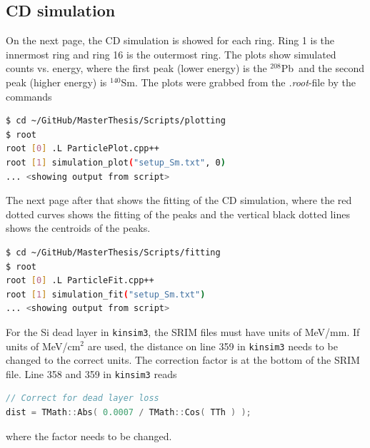 \documentclass[twoside,english]{uiofysmaster/uiofysmaster}
\newcommand{\Sm}{$^{140}$Sm} %
\newcommand{\Pb}{$^{208}$Pb}
\begin{document}
\begin{appendices}


\chapter{CD simulation}\label{ch:cd_sim}
On the next page, the CD simulation is showed for each ring. Ring 1 is the innermost ring and ring 16 is the outermost ring. The plots show simulated counts vs. energy, where the first peak (lower energy) is the \Pb\ and the second peak (higher energy) is \Sm. The plots were grabbed from the \textit{.root}-file by the commands

\begin{lstlisting}[language=sh]
$ cd ~/GitHub/MasterThesis/Scripts/plotting
$ root
root [0] .L ParticlePlot.cpp++
root [1] simulation_plot("setup_Sm.txt", 0)
... <showing output from script>
\end{lstlisting}

The next page after that shows the fitting of the CD simulation, where the red dotted curves shows the fitting of the peaks and the vertical black dotted lines shows the centroids of the peaks.

\begin{lstlisting}[language=sh]
$ cd ~/GitHub/MasterThesis/Scripts/fitting
$ root
root [0] .L ParticleFit.cpp++
root [1] simulation_fit("setup_Sm.txt")
... <showing output from script>
\end{lstlisting}

For the Si dead layer in \texttt{kinsim3}, the SRIM files must have units of MeV/mm. 
If units of MeV/cm$^2$ are used, the distance on line 359 in \texttt{kinsim3} needs to be changed to the correct units. 
The correction factor is at the bottom of the SRIM file.
Line 358 and 359 in \texttt{kinsim3} reads
\begin{lstlisting}[language=c++]
// Correct for dead layer loss
dist = TMath::Abs( 0.0007 / TMath::Cos( TTh ) );
\end{lstlisting}
where the factor needs to be changed.







\end{appendices}


%


\end{document}

